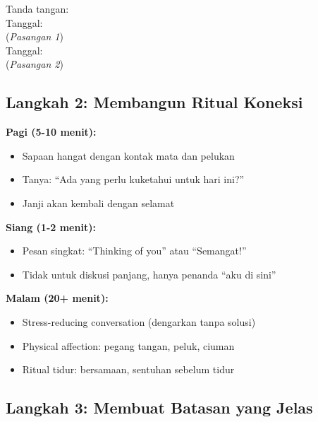 \begin{exercisebox}
\vspace{0.5cm}
Tanda tangan:\\[0.3cm]
\underline{\hspace{6cm}} \quad Tanggal: \underline{\hspace{3cm}}\\[0.2cm]
(\textit{Pasangan 1})\\[0.5cm]
\underline{\hspace{6cm}} \quad Tanggal: \underline{\hspace{3cm}}\\[0.2cm]
(\textit{Pasangan 2})
\end{exercisebox}

\subsection{Langkah 2: Membangun Ritual Koneksi}

\begin{tipbox}
\textbf{Pagi (5-10 menit):}
\begin{itemize}
    \item Sapaan hangat dengan kontak mata dan pelukan
    \item Tanya: ``Ada yang perlu kuketahui untuk hari ini?''
    \item Janji akan kembali dengan selamat
\end{itemize}

\textbf{Siang (1-2 menit):}
\begin{itemize}
    \item Pesan singkat: ``Thinking of you'' atau ``Semangat!''
    \item Tidak untuk diskusi panjang, hanya penanda ``aku di sini''
\end{itemize}

\textbf{Malam (20+ menit):}
\begin{itemize}
    \item Stress-reducing conversation (dengarkan tanpa solusi)
    \item Physical affection: pegang tangan, peluk, ciuman
    \item Ritual tidur: bersamaan, sentuhan sebelum tidur
\end{itemize}
\end{tipbox}

\subsection{Langkah 3: Membuat Batasan yang Jelas}

